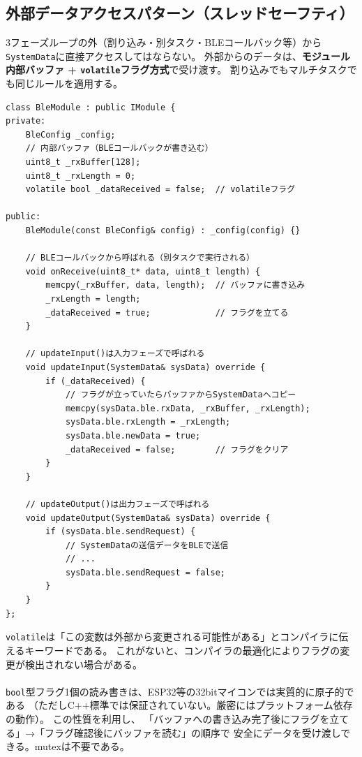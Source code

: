 \subsection{外部データアクセスパターン（スレッドセーフティ）}

3フェーズループの外（割り込み・別タスク・BLEコールバック等）から\texttt{SystemData}に直接アクセスしてはならない。
外部からのデータは、\textbf{モジュール内部バッファ + \texttt{volatile}フラグ方式}で受け渡す。
割り込みでもマルチタスクでも同じルールを適用する。

\begin{lstlisting}[style=cppstyle, caption={外部データアクセスパターン（volatile フラグ方式）}]
class BleModule : public IModule {
private:
    BleConfig _config;
    // 内部バッファ（BLEコールバックが書き込む）
    uint8_t _rxBuffer[128];
    uint8_t _rxLength = 0;
    volatile bool _dataReceived = false;  // volatileフラグ

public:
    BleModule(const BleConfig& config) : _config(config) {}

    // BLEコールバックから呼ばれる（別タスクで実行される）
    void onReceive(uint8_t* data, uint8_t length) {
        memcpy(_rxBuffer, data, length);  // バッファに書き込み
        _rxLength = length;
        _dataReceived = true;             // フラグを立てる
    }

    // updateInput()は入力フェーズで呼ばれる
    void updateInput(SystemData& sysData) override {
        if (_dataReceived) {
            // フラグが立っていたらバッファからSystemDataへコピー
            memcpy(sysData.ble.rxData, _rxBuffer, _rxLength);
            sysData.ble.rxLength = _rxLength;
            sysData.ble.newData = true;
            _dataReceived = false;        // フラグをクリア
        }
    }

    // updateOutput()は出力フェーズで呼ばれる
    void updateOutput(SystemData& sysData) override {
        if (sysData.ble.sendRequest) {
            // SystemDataの送信データをBLEで送信
            // ...
            sysData.ble.sendRequest = false;
        }
    }
};
\end{lstlisting}

\begin{notebox}[volatileフラグ方式を使う理由]
\texttt{volatile}は「この変数は外部から変更される可能性がある」とコンパイラに伝えるキーワードである。
これがないと、コンパイラの最適化によりフラグの変更が検出されない場合がある。\\
\\
\texttt{bool}型フラグ1個の読み書きは、ESP32等の32bitマイコンでは実質的に原子的である
（ただしC++標準では保証されていない。厳密にはプラットフォーム依存の動作）。
この性質を利用し、
「バッファへの書き込み完了後にフラグを立てる」→「フラグ確認後にバッファを読む」の順序で
安全にデータを受け渡しできる。mutexは不要である。
\end{notebox}

